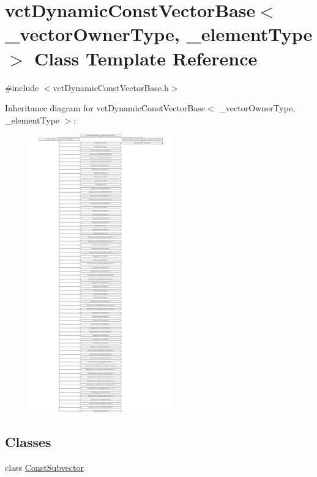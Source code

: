 \hypertarget{classvct_dynamic_const_vector_base}{}\section{vct\+Dynamic\+Const\+Vector\+Base$<$ \+\_\+vector\+Owner\+Type, \+\_\+element\+Type $>$ Class Template Reference}
\label{classvct_dynamic_const_vector_base}


{\ttfamily \#include $<$vct\+Dynamic\+Const\+Vector\+Base.\+h$>$}

Inheritance diagram for vct\+Dynamic\+Const\+Vector\+Base$<$ \+\_\+vector\+Owner\+Type, \+\_\+element\+Type $>$\+:\begin{figure}[H]
\begin{center}
\leavevmode
\includegraphics[height=12.000000cm]{df/d70/classvct_dynamic_const_vector_base}
\end{center}
\end{figure}
\subsection*{Classes}
\begin{DoxyCompactItemize}
\item 
class \hyperlink{classvct_dynamic_const_vector_base_1_1_const_subvector}{Const\+Subvector}
\end{DoxyCompactItemize}
